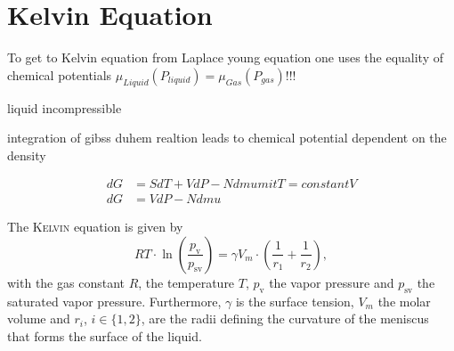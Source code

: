 \documentclass[../thesis.tex]{subfiles}
\begin{document}
    \section{Kelvin Equation}
    \label{sec:kelvin-equation}

    To get to Kelvin equation from Laplace young equation one uses the equality of chemical potentials $\mu_{Liquid}(P_{liquid}) = \mu_{Gas}(P_{gas})$!!!

    liquid incompressible

    integration of gibss duhem realtion leads to chemical potential dependent on the density

    \begin{align}
        dG &= SdT + VdP - N dmu mit T = constantV   \\
        dG &= VdP - N dmu
    \end{align}




    The \textsc{Kelvin} equation is given by
    \begin{equation}
        RT\cdot \ln \left(\frac{p_\mathrm{v}}{p_\mathrm{sv}}\right) = \gamma V_m\cdot \left( \frac{1}{r_1} + \frac{1}{r_2}\right),
        \label{eq:kelvin}
    \end{equation}
    with the gas constant $R$, the temperature $T$, $p_\mathrm{v}$ the vapor pressure and $p_\mathrm{sv}$ the saturated vapor pressure. Furthermore, $\gamma $ is the surface tension, $V_m$ the molar volume and $r_i$, $i\in \{1,2\}$, are the radii defining the curvature of the meniscus that forms the surface of the liquid.
\end{document}
